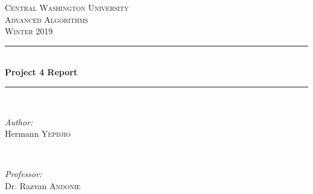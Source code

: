 \documentclass[12pt]{article}
\begin{document}
	
	\begin{titlepage}
		
		\newcommand{\HRule}{\rule{\linewidth}{0.5mm}} %
		
		\center %
		
		
		\textsc{\LARGE Central Washington University}\\[1.5cm] %
		\textsc{\Large Advanced Algorithms}\\[0.5cm] %
		\textsc{\large Winter 2019}\\[0.5cm] %
		
		
		\HRule \\[0.4cm]
		{ \huge \bfseries Project 4 Report}\\[0.4cm] %
		\HRule \\[1.5cm]
		
		
		\begin{minipage}{0.4\textwidth}
			\begin{flushleft} \large
				\emph{Author:}\\
				Hermann \textsc{Yepdjio} %
			\end{flushleft}
		\end{minipage}
		~
		\begin{minipage}{0.4\textwidth}
			\begin{flushright} \large
				\emph{Professor:} \\
				Dr. Razvan \textsc{Andonie} %
			\end{flushright}
		\end{minipage}\\[1cm]
		

\end{titlepage}
\end{document}
